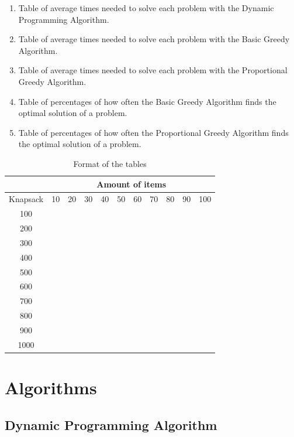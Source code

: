 \begin{itemize}
    \begin{enumerate}
        \item Table of average times needed to solve each problem with the Dynamic Programming Algorithm.
        \item Table of average times needed to solve each problem with the Basic Greedy Algorithm.
        \item Table of average times needed to solve each problem with the Proportional Greedy Algorithm.
        \item Table of percentages of how often the Basic Greedy Algorithm finds the optimal solution of a problem.
        \item Table of percentages of how often the Proportional Greedy Algorithm finds the optimal solution of a problem.
    \end{enumerate}
\end{itemize}

\begin{table}[h]
\centering
\begin{tabular}{|c|c|c|c|c|c|c|c|c|c|c|}
\hline
& \multicolumn{10}{c|}{Amount of items} \\
\hline
Knapsack & 10 & 20 & 30 & 40 & 50 & 60 & 70 & 80 & 90 & 100 \\
\hline
100 & & & & & & & & & & \\
\hline
200 & & & & & & & & & & \\
\hline
300 & & & & & & & & & & \\
\hline
400 & & & & & & & & & & \\
\hline
500 & & & & & & & & & & \\
\hline
600 & & & & & & & & & & \\
\hline
700 & & & & & & & & & & \\
\hline
800 & & & & & & & & & & \\
\hline
900 & & & & & & & & & & \\
\hline
1000 & & & & & & & & & & \\
\hline
\end{tabular}
\caption{Format of the tables}
\label{tab:table_format}
\end{table}

\newpage

\chapter*{Algorithms}

\section*{Dynamic Programming Algorithm}

